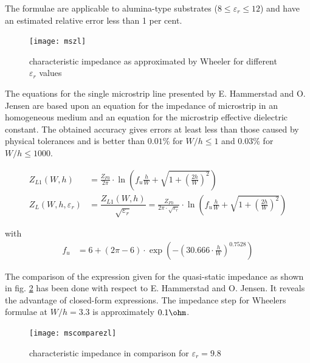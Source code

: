 \documentclass[10pt]{report}
\begin{document}
The formulae are applicable to alumina-type substrates ($8 \le
\varepsilon_r \le 12$) and have an estimated relative error less than
1 per cent.

\begin{figure}[ht]
\begin{center}
\texttt{[image: mszl]}
\end{center}
\caption{characteristic impedance as approximated by Wheeler for different $\varepsilon_{r}$ values}
\label{fig:mszl}
\end{figure}
\FloatBarrier

The equations for the single microstrip line presented by
E. Hammerstad and O. Jensen \cite{Hammerstad} are based upon an
equation for the impedance of microstrip in an homogeneous medium and
an equation for the microstrip effective dielectric constant.  The
obtained accuracy gives errors at least less than those caused by
physical tolerances and is better than $0.01\%$ for $W/h \le 1$ and
$0.03\%$ for $W/h \le 1000$.

\begin{align}
\label{eq:HandJZL0}
Z_{L1}\left(W, h\right) &=
\frac{Z_{F0}}{2\pi}\cdot\ln{\left(f_{u}\frac{h}{W} + \sqrt{1 + \left(\frac{2h}{W}\right)^{2}}\right)}\\
Z_{L}\left(W, h, \varepsilon_{r}\right) &= \dfrac{Z_{L1} \left(W, h\right)}{\sqrt{\varepsilon_{r}}} = \frac{Z_{F0}}{2\pi\cdot\sqrt{\varepsilon_{r}}}\cdot\ln{\left(f_{u}\frac{h}{W} + \sqrt{1 + \left(\frac{2h}{W}\right)^{2}}\right)}
\end{align}

with
\begin{align}
f_{u} &= 6 + \left(2\pi - 6\right)\cdot\exp{\left(-\left(30.666\cdot\frac{h}{W}\right)^{0.7528}\right)}
\end{align}

The comparison of the expression given for the quasi-static impedance
as shown in fig. \ref{fig:mscomparezl} has been done with respect to
E. Hammerstad and O. Jensen.  It reveals the advantage of closed-form
expressions.  The impedance step for Wheelers formulae at $W/h = 3.3$
is approximately $0.1\ohm$.

\begin{figure}[ht]
\begin{center}
\texttt{[image: mscomparezl]}
\end{center}
\caption{characteristic impedance in comparison for $\varepsilon_{r} = 9.8$}
\label{fig:mscomparezl}
\end{figure}
\FloatBarrier
\end{document}
